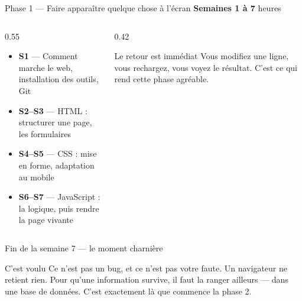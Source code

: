 \documentclass[aspectratio=169,11pt]{beamer}
\begin{document}
\begin{frame}{Phase 1 --- Faire apparaître quelque chose à l'écran}
  \textbf{Semaines 1 à 7} \quad\textcolor{cfptDarkGrey}{\textbar} heures
  \medskip

  \begin{columns}[T]
    \begin{column}{0.55\textwidth}
      \begin{itemize}
        \item \textbf{S1} --- Comment marche le web, installation des outils, Git
        \item \textbf{S2--S3} --- HTML : structurer une page, les formulaires
        \item \textbf{S4--S5} --- CSS : mise en forme, adaptation au mobile
        \item \textbf{S6--S7} --- JavaScript : la logique, puis rendre la page vivante
      \end{itemize}
    \end{column}
    \begin{column}{0.42\textwidth}
      \begin{block}{Le retour est immédiat}
        Vous modifiez une ligne, vous rechargez, vous voyez le résultat. C'est ce qui rend cette phase agréable.
      \end{block}
    \end{column}
  \end{columns}
\end{frame}

\begin{frame}{Fin de la semaine 7 --- le moment charnière}
  \begin{center}
  \end{center}
  \vspace{0.4cm}
  \begin{alertblock}{C'est voulu}
    Ce n'est pas un bug, et ce n'est pas votre faute. Un navigateur ne retient rien. Pour qu'une information survive, il faut la ranger ailleurs --- dans une base de données. C'est exactement là que commence la phase 2.
  \end{alertblock}
\end{frame}
\end{document}

